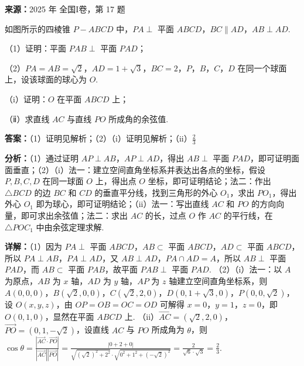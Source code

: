 \begin{question}[points=15]
\textbf{来源：}2025 年 全国I卷，第 17 题\par
如图所示的四棱锥 $P-ABCD$ 中，$PA \perp$ 平面 $ABCD$，$BC \parallel AD$，$AB \perp AD$.



（1）证明：平面 $PAB \perp$ 平面 $PAD$；



（2）$PA = AB = \sqrt{2}$，$AD = 1+\sqrt{3}$，$BC = 2$，$P$，$B$，$C$，$D$ 在同一个球面上，设该球面的球心为 $O$.



（i）证明：$O$ 在平面 $ABCD$ 上；



（ⅱ）求直线 $AC$ 与直线 $PO$ 所成角的余弦值.
\begin{solution}
\textbf{答案：}（1）证明见解析；（2）（i）证明见解析；（ii）$\frac{2}{3}$

\textbf{分析：}（1）通过证明 $AP \perp AB$，$AP \perp AD$，得出 $AB \perp$ 平面 $PAD$，即可证明面面垂直；（2）（i）法一：建立空间直角坐标系并表达出各点的坐标，假设 $P,B,C,D$ 在同一球面 $O$ 上，得出点 $O$ 坐标，即可证明结论；法二：作出 $\triangle BCD$ 的边 $BC$ 和 $CD$ 的垂直平分线，找到三角形的外心 $O_1$，求出 $PO_1$，得出外心 $O_1$ 即为球心，即可证明结论；（ii）法一：写出直线 $AC$ 和 $PO$ 的方向向量，即可求出余弦值；法二：求出 $AC$ 的长，过点 $O$ 作 $AC$ 的平行线，在 $\triangle POC_1$ 中由余弦定理求解.

\textbf{详解：}（1）因为 $PA \perp$ 平面 $ABCD$，$AB \subset$ 平面 $ABCD$，$AD \subset$ 平面 $ABCD$，所以 $PA \perp AB$，$PA \perp AD$，又 $AB \perp AD$，$PA \cap AD = A$，所以 $AB \perp$ 平面 $PAD$，而 $AB \subset$ 平面 $PAB$，故平面 $PAB \perp$ 平面 $PAD$.
（2）（i）法一：以 $A$ 为原点，$AB$ 为 $x$ 轴，$AD$ 为 $y$ 轴，$AP$ 为 $z$ 轴建立空间直角坐标系，则 $A(0,0,0)$，$B(\sqrt{2},0,0)$，$C(\sqrt{2},2,0)$，$D(0,1+\sqrt{3},0)$，$P(0,0,\sqrt{2})$，设 $O(x,y,z)$，由 $OP=OB=OC=OD$ 可解得 $x=0$，$y=1$，$z=0$，即 $O(0,1,0)$，显然在平面 $ABCD$ 上.
（ii）$\overrightarrow{AC} = (\sqrt{2},2,0)$，$\overrightarrow{PO} = (0,1,-\sqrt{2})$，设直线 $AC$ 与 $PO$ 所成角为 $\theta$，则 $\cos\theta = \frac{|\overrightarrow{AC} \cdot \overrightarrow{PO}|}{|\overrightarrow{AC}| |\overrightarrow{PO}|} = \frac{|0+2+0|}{\sqrt{(\sqrt{2})^2+2^2} \cdot \sqrt{0^2+1^2+(-\sqrt{2})^2}} = \frac{2}{\sqrt{6} \cdot \sqrt{3}} = \frac{2}{3}$.
\end{solution}
\end{question}

